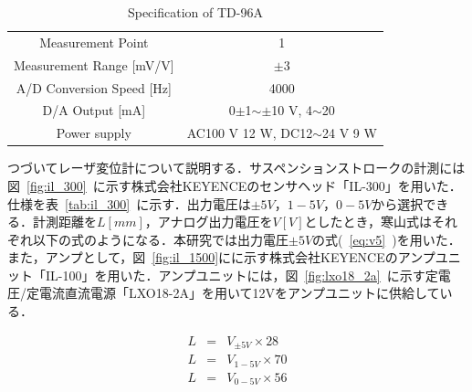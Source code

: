 \documentclass[a4paper,12pt]{article_vdlab_sotsuron}
\begin{document}
\vspace*{10mm}
\begin{table}[h]
  \begin{center}
    \caption{Specification of TD-96A}
    \label{tab:td_96a}
    \begin{tabular}{cc}\hline
      Measurement Point & 1 \\
      Measurement Range [mV/V]& $\pm$3\\
      A/D Conversion Speed [Hz]& 4000\\
      D/A Output [mA]& 0$\pm$1$\sim\pm$10 V, 4$\sim$20\\
      Power supply & AC100 V 12 W, DC12$\sim$24 V 9 W \\\hline
    \end{tabular}
  \end{center}
\end{table}

\newpage
つづいてレーザ変位計について説明する．サスペンションストロークの計測には図~\ref{fig:il_300}~に示す株式会社KEYENCEのセンサヘッド「IL-300」を用いた．仕様を表~\ref{tab:il_300}~に示す．出力電圧は$\pm 5V，1-5V，0-5V$から選択できる．計測距離を$L[mm]$，アナログ出力電圧を$V[V]$としたとき，寒山式はそれぞれ以下の式のようになる．本研究では出力電圧$\pm 5V$の式(~\ref{eq:v5}~)を用いた．また，アンプとして，図~\ref{fig:il_1500}にに示す株式会社KEYENCEのアンプユニット「IL-100」を用いた．アンプユニットには，図~\ref{fig:lxo18_2a}~に示す定電圧/定電流直流電源「LXO18-2A」を用いて12Vをアンプユニットに供給している．

\begin{eqnarray}
 \label{eq:v5} L &=& V_{\pm5V} \times 28\\
 \label{eq:v15} L &=& V_{1-5V} \times 70\\
 \label{eq:v05} L &=& V_{0-5V} \times 56
\end{eqnarray}
\end{document}

